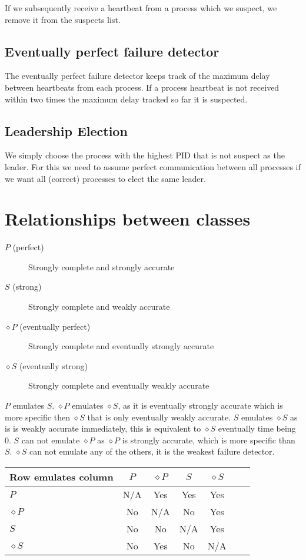 \documentclass[11pt]{amsart}
\begin{document}
If we subsequently receive a heartbeat from a process which we suspect, we remove
it from the suspects list.

\subsection{Eventually perfect failure detector}

The eventually perfect failure detector keeps track of the maximum delay
between heartbeats from each process. If a process heartbeat is not received
within two times the maximum delay tracked so far it is suspected.

\subsection{Leadership Election}

We simply choose the process with the highest PID that is not suspect as the leader.
For this we need to assume perfect communication between all processes if we want
all (correct) processes to elect the same leader.

\section{Relationships between classes}

\begin{description}
	\item[$P$ (perfect)] Strongly complete and strongly accurate
	\item[$S$ (strong)] Strongly complete and weakly accurate
	\item[$\diamond P$ (eventually perfect)] Strongly complete and eventually strongly accurate
	\item[$\diamond S$ (eventually strong)] Strongly complete and eventually weakly accurate
\end{description}

$P$ emulates $S$. 
$\diamond P$ emulates $\diamond S$, as it is eventually strongly accurate which
is more specific then $\diamond S$ that is only eventually weakly accurate.
$S$ emulates $\diamond S$ as is is weakly accurate immediately, this is equivalent to $\diamond S$ eventually time being 0.
$S$ can not emulate $\diamond P$ as $\diamond P$ is strongly accurate, which is more specific than $S$.
$\diamond S$ can not emulate any of the others, it is the weakest failure detector.

\begin{tabular}{|l|c|c|c|c|c|c|}
\hline
Row emulates column  & $P$ & $\diamond P$ & $S$ & $\diamond S$ \\ \hline
$P$                  & N/A & Yes          & Yes & Yes          \\ \hline
$\diamond P$         & No  & N/A          & No  & Yes          \\ \hline
$S$                  & No  & No           & N/A & Yes          \\ \hline
$\diamond S$         & No  & Yes          & No  & N/A          \\ \hline
\end{tabular}
\end{document}

